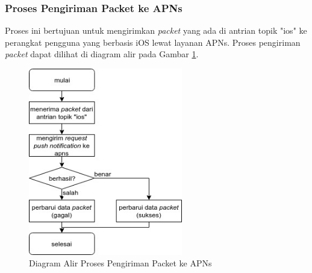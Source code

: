 \subsubsection{Proses Pengiriman Packet ke APNs}
\par Proses ini bertujuan untuk mengirimkan \textit{packet} yang ada di antrian topik "ios" ke perangkat pengguna yang berbasis iOS lewat layanan APNs. Proses pengiriman \textit{packet} dapat dilihat di diagram alir pada
Gambar \ref{flowchart_pengiriman_packet_ke_apns}.
\begin{figure}[hb]
    \centering\includegraphics[width=0.6\textwidth]{bab3/flowchart/flowchart-pengiriman_packet_ke_apns.jpg}
    \caption{Diagram Alir Proses Pengiriman Packet ke APNs} \label{flowchart_pengiriman_packet_ke_apns}
\end{figure}

